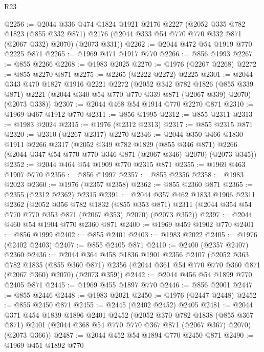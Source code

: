 \begin{lexlean}{R23}
\begin{coremodule}
@2256 := @2044
    @336
    @474
    @1824
    @1921
    @2176
    @2227
    (@2052
      @335
      @782
      @1823
      (@855 @332 @871)
      @2176
      (@2044 @333 @54 @770 @770 @332 @871 (@2067 @332) @2070)
      (@2073 @331))
@2262 := @2044 @472 @54 @1919 @770 @2225 @871
@2265 := @1969 @471 @1917 @770
@2266 := @856 @1993
@2267 := @855 @2266
@2268 := @1983 @2025
@2270 := @1976 (@2267 @2268)
@2272 := @855 @2270 @871
@2275 := @2265 (@2222 @2272) @2225
@2301 := @2044
    @343
    @470
    @1827
    @1916
    @2221
    @2272
    (@2052
      @342
      @782
      @1826
      (@855 @339 @871)
      @2221
      (@2044 @340 @54 @770 @770 @339 @871 (@2067 @339) @2070)
      (@2073 @338))
@2307 := @2044 @468 @54 @1914 @770 @2270 @871
@2310 := @1969 @467 @1912 @770
@2311 := @856 @1995
@2312 := @855 @2311
@2313 := @1983 @2024
@2315 := @1976 (@2312 @2313)
@2317 := @855 @2315 @871
@2320 := @2310 (@2267 @2317) @2270
@2346 := @2044
    @350
    @466
    @1830
    @1911
    @2266
    @2317
    (@2052
      @349
      @782
      @1829
      (@855 @346 @871)
      @2266
      (@2044 @347 @54 @770 @770 @346 @871 (@2067 @346) @2070)
      (@2073 @345))
@2352 := @2044 @464 @54 @1909 @770 @2315 @871
@2355 := @1969 @463 @1907 @770
@2356 := @856 @1997
@2357 := @855 @2356
@2358 := @1983 @2023
@2360 := @1976 (@2357 @2358)
@2362 := @855 @2360 @871
@2365 := @2355 (@2312 @2362) @2315
@2391 := @2044
    @357
    @462
    @1833
    @1906
    @2311
    @2362
    (@2052
      @356
      @782
      @1832
      (@855 @353 @871)
      @2311
      (@2044 @354 @54 @770 @770 @353 @871 (@2067 @353) @2070)
      (@2073 @352))
@2397 := @2044 @460 @54 @1904 @770 @2360 @871
@2400 := @1969 @459 @1902 @770
@2401 := @856 @1999
@2402 := @855 @2401
@2403 := @1983 @2022
@2405 := @1976 (@2402 @2403)
@2407 := @855 @2405 @871
@2410 := @2400 (@2357 @2407) @2360
@2436 := @2044
    @364
    @458
    @1836
    @1901
    @2356
    @2407
    (@2052
      @363
      @782
      @1835
      (@855 @360 @871)
      @2356
      (@2044 @361 @54 @770 @770 @360 @871 (@2067 @360) @2070)
      (@2073 @359))
@2442 := @2044 @456 @54 @1899 @770 @2405 @871
@2445 := @1969 @455 @1897 @770
@2446 := @856 @2001
@2447 := @855 @2446
@2448 := @1983 @2021
@2450 := @1976 (@2447 @2448)
@2452 := @855 @2450 @871
@2455 := @2445 (@2402 @2452) @2405
@2481 := @2044
    @371
    @454
    @1839
    @1896
    @2401
    @2452
    (@2052
      @370
      @782
      @1838
      (@855 @367 @871)
      @2401
      (@2044 @368 @54 @770 @770 @367 @871 (@2067 @367) @2070)
      (@2073 @366))
@2487 := @2044 @452 @54 @1894 @770 @2450 @871
@2490 := @1969 @451 @1892 @770

\end{coremodule}
\end{lexlean}
